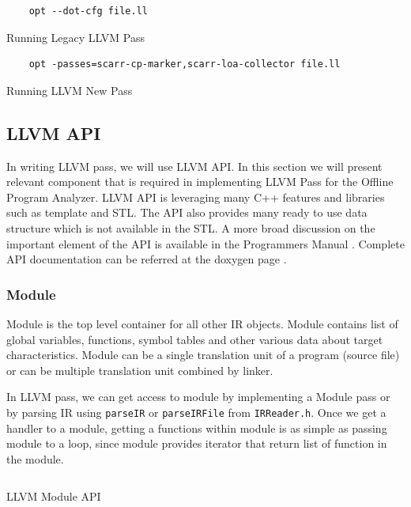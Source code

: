 \begin{listing}
\begin{verbatim}
    opt --dot-cfg file.ll 
\end{verbatim}
\caption{Running Legacy LLVM Pass}    
\label{listing:2-3}
\end{listing}

\begin{listing}
\begin{verbatim}
    opt -passes=scarr-cp-marker,scarr-loa-collector file.ll 
\end{verbatim}
\caption{Running LLVM New Pass}    
\label{listing:2-4}
\end{listing}

\subsection{LLVM API}

In writing LLVM pass, we will use LLVM API. In this section we will present relevant component that is required in implementing LLVM Pass for the Offline Program Analyzer. LLVM API is leveraging many C++ features and libraries such as template and STL. The API also provides many ready to use data structure which is not available in the STL. A more broad discussion on the important element of the API is available in the Programmers Manual \cite{LLVMProgrammerManuala}. Complete API documentation can be referred at the doxygen page \cite{LLVMLLVMa}.

\subsubsection{Module}

Module is the top level container for all other IR objects. Module contains list of global variables, functions, symbol tables and other various data about target characteristics. Module can be a single translation unit of a program (source file) or can be multiple translation unit combined by linker. 

In LLVM pass, we can get access to module by implementing a Module pass or by parsing IR using \texttt{parseIR} or \texttt{parseIRFile} from \texttt{IRReader.h}. Once we get a handler to a module, getting a functions within module is as simple as passing module to a loop, since module provides iterator that return list of function in the module.

\begin{listing}
\inputminted[]{cpp}{code/module.cpp}
\caption{LLVM Module API}    
\label{listing:2-5}
\end{listing}

